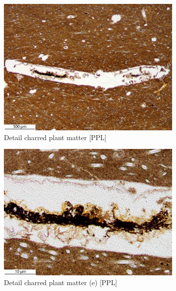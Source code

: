 \documentclass[a4paper]{article}
\begin{document}
\begin{figure}[H]
\begin{subfigure}[t]{.32\textwidth}
		\includegraphics[width=\textwidth]{ThinSections/47-2_4x_PPL.jpg}
		\caption{Detail charred plant matter [PPL]}
	\end{subfigure}\hspace{.1em}\hfill
	\begin{subfigure}[t]{.32\textwidth}
		\includegraphics[width=\textwidth]{ThinSections/47-2a_20x_PPL.jpg}
		\caption{Detail charred plant matter (e) [PPL]}
	\end{subfigure}\hspace{.1em}\hfill
	\begin{subfigure}[t]{.32\textwidth}

\end{subfigure}
\end{figure}
\end{document}
